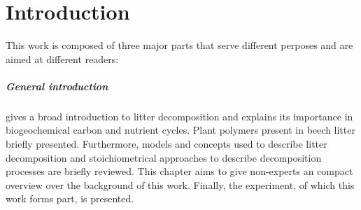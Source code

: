 \documentclass[a4paper,10pt]{book}
\begin{document}
% 
% 
% 
% 
% 
% 

\chapter*{Introduction}


This work is composed of three major parts that serve different perposes and are aimed at different readers: 

\paragraph{General introduction} gives a broad introduction to litter decomposition and explains its importance in biogeochemical carbon and nutrient cycles. Plant polymers present in beech litter briefly presented. Furthermore, models and concepts used to describe litter decomposition and stoichiometrical approaches to describe decomposition processes are briefly reviewed. This chapter aims to give non-experts an compact overview over the background of this work. Finally, the experiment, of which this work forms part, is presented. 
\end{document}
